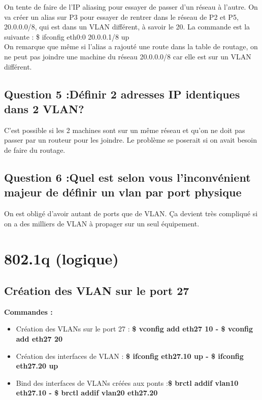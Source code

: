 \documentclass[a4paper]{article}
\begin{document}
On tente de faire de l'IP aliasing pour essayer de passer d'un réseau à l'autre. On va créer un alias sur P3 pour essayer de rentrer dans le réseau de P2 et P5, 20.0.0.0/8, qui est dans un VLAN différent, à savoir le 20. La commande est la suivante : \$ ifconfig eth0:0 20.0.0.1/8 up \\

On remarque que même si l'alias a rajouté une route dans la table de routage, on ne peut pas joindre une machine du réseau 20.0.0.0/8 car elle est sur un VLAN différent.

		\subsection{Question 5 :Définir 2 adresses IP identiques dans 2 VLAN?}

C'est possible si les 2 machines sont sur un même réseau et qu'on ne doit pas passer par un routeur pour les joindre. Le problème se poserait si on avait besoin de faire du routage. 

		\subsection{Question 6 :Quel est selon vous l'inconvénient majeur de définir un vlan par port physique}

On est obligé d'avoir autant de ports que de VLAN. Ça devient très compliqué si on a des milliers de VLAN à propager sur un seul équipement.


	\section{802.1q (logique)}
		\subsection{Création des VLAN sur le port 27} 

\textbf{Commandes :} 

\begin{itemize}
	\item Création des VLANs sur le port 27 : \textbf{\$ vconfig add eth27 10  - \$ vconfig add eth27 20}\\
	\item Création des interfaces de VLAN : \textbf{\$ ifconfig eth27.10 up - \$ ifconfig eth27.20 up} \\
	\item  Bind des interfaces de VLANs créées aux ponts :\textbf{\$ brctl addif vlan10 eth27.10 - \$ brctl addif vlan20 eth27.20} \\
\end{itemize}
\end{document}
